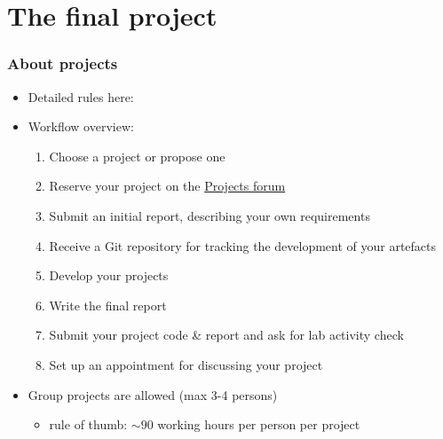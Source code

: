 \documentclass[handout]{beamer}\mode<presentation>{\usetheme{AMSCesenaPurpleAndGold}}
\begin{document}
\section{The final project}

\begin{frame}%
    \frametitle{About projects}
    \begin{itemize}
        \item Detailed rules here: 

        \vfill

        \item Workflow overview:
        \begin{enumerate}
            \item Choose a project or propose one
            \item Reserve your project on the \href{https://virtuale.unibo.it/mod/forum/view.php?id=331532}{Projects forum}
            \item Submit an \alert{initial report}, describing your own requirements
            \item Receive a Git repository for tracking the development of your artefacts
            \item Develop your projects
            \item Write the \alert{final report}
            \item Submit your project \alert{code \& report} and ask for lab activity check
            \item Set up an appointment for discussing your project
        \end{enumerate}

        \vfill

        \item Group projects are allowed (max 3-4 persons)
        \begin{itemize}
            \item rule of thumb: $\sim90$ working hours per person per project
        \end{itemize}
    \end{itemize}
\end{frame}

\section*{}
\frame{\titlepage}
\end{document}
